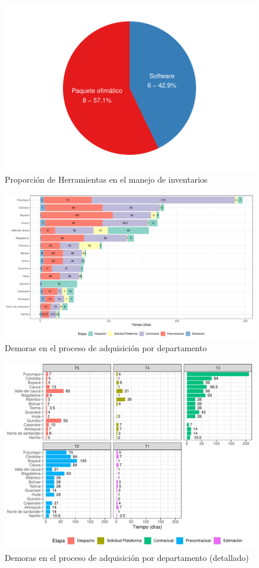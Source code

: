 \documentclass[
]{book}
\begin{document}
\begin{figure}
\includegraphics[width=0.85\linewidth]{InformeFinal_files/figure-latex/PropHerramientasManejoInventarios-1} \caption{Proporción de Herramientas en el manejo de inventarios}\label{fig:PropHerramientasManejoInventarios}
\end{figure}

\begin{figure}
\includegraphics[width=1\linewidth]{InformeFinal_files/figure-latex/EtapasProcesoAdquisicion-1} \caption{Demoras en el proceso de adquisición por departamento}\label{fig:EtapasProcesoAdquisicion}
\end{figure}

\begin{figure}
\includegraphics[width=0.85\linewidth]{InformeFinal_files/figure-latex/EtapasProcesoAdquisicionDetalle-1} \caption{Demoras en el proceso de adquisición por departamento (detallado)}\label{fig:EtapasProcesoAdquisicionDetalle}
\end{figure}
\end{document}
